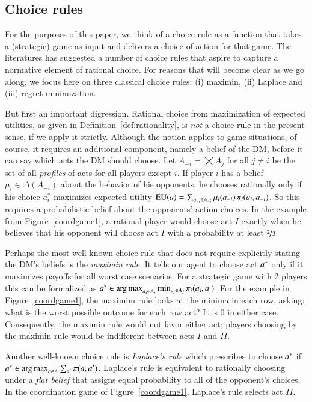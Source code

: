 \documentclass[fleqn,reqno,11pt]{article}
\begin{document}
\subsection{Choice rules} 
\label{sec:choice-rules}

For the purposes of this paper, we think of a choice rule as a function that takes a
(strategic) game as input and delivers a choice of action for that game. The literatures has
suggested a number of choice rules that aspire to capture a normative element of rational
choice. For reasons that will become clear as we go along, we focus here on three classical
choice rules: (i) maximin, (ii) Laplace and (iii) regret minimization.

But first an important digression. Rational choice from maximization of expected utilities, as
given in Definition~\ref{def:rationality}, is \emph{not} a choice rule in the present sense, if
we apply it strictly. Although the notion applies to game situations, of course, it requires an
additional component, namely a belief of the DM, before it can say which acts the DM should
choose. Let $A_{-i} = \bigtimes A_j$ for all $j \neq i$ be the set of all \emph{profiles} of
acts for all players except $i$. If player $i$ has a belief $\mu_i \in \Delta(A_{-i})$ about
the behavior of his opponents, he chooses rationally only if his choice $a^*_i$ maximizes
expected utility
$\operatorname{EU}(a) = \sum_{a_{-i} \in A_{-i}} \mu_i(a_{-i}) \thinspace \pi_i(a_i, a_{-i})$. So this
requires a probabilistic belief about the opponents' action choices. In the example from
Figure~\ref{coordgame1}, a rational player would choose act $I$ exactly when he believes that
his opponent will choose act $I$ with a probability at least $\nicefrac{2}{3}$.

Perhaps the most well-known choice rule that does not require explicitly stating the DM's
beliefs is the \emph{maximin rule}. It tells our agent to choose act $a^*$ only if it
maximizes payoffs for all worst case scenarios. For a strategic game with 2 players this can be
formalized as
$a^* \in \operatorname*{arg\,max}_{a_{\text{i}} \in A_i} \min_{a_{\text{j}} \in A_j} \pi_i(a_{\text{i}},
a_{\text{j}})$.
For the example in Figure~\ref{coordgame1}, the maximim rule looks at the minima in each row,
asking: what is the worst possible outcome for each row act? It is $0$ in either
case. Consequently, the maximin rule would not favor either act; players choosing by the
maximin rule would be indifferent between acts $I$ and $II$.

Another well-known choice rule is \emph{Laplace's rule} which prescribes to choose $a^*$ if
$a^* \in \operatorname*{arg\,max}_{a \in A} \sum_{a'} \pi(a, a')$. Laplace's rule is equivalent to rationally
choosing under a \emph{flat belief} that assigns equal probability to all of the opponent's
choices. In the coordination game of Figure~\ref{coordgame1}, Laplace's rule selects act $II$.
\end{document}

